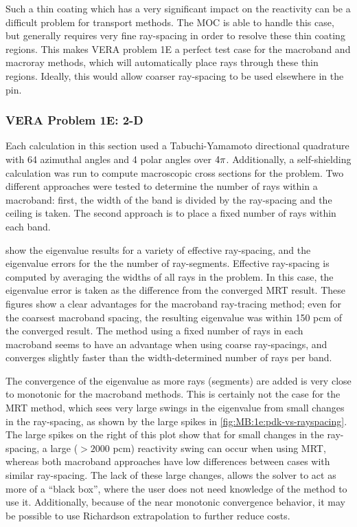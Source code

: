 {{{      Such a thin coating which has a very significant impact on the reactivity can be a difficult problem for transport methods.
      The \ac{MOC} is able to handle this case, but generally requires very fine ray-spacing in order to resolve these thin coating regions.
      This makes \ac{VERA} problem 1E a perfect test case for the macroband and macroray methods, which will automatically place rays through these thin regions.
      Ideally, this would allow coarser ray-spacing to be used elsewhere in the pin.

      \subsubsection{VERA Problem 1E: 2-D}{\label{sssec:MR:1E:2-D}
        Each calculation in this section used a Tabuchi-Yamamoto \cite{TabuchiYamamotoQuad} directional quadrature with 64 azimuthal angles and 4 polar angles over $4\pi$.
        Additionally, a self-shielding calculation was run to compute macroscopic cross sections for the problem.
        Two different approaches were tested to determine the number of rays within a macroband: first, the width of the band is divided by the ray-spacing and the ceiling is taken.
        The second approach is to place a fixed number of rays within each band.

         show the eigenvalue results for a variety of effective ray-spacing, and the eigenvalue errors for the the number of ray-segments.
        Effective ray-spacing is computed by averaging the widths of all rays in the problem.
        In this case, the eigenvalue error is taken as the difference from the converged \ac{MRT} result.
        These figures show a clear advantages for the macroband ray-tracing method;
          even for the coarsest macroband spacing, the resulting eigenvalue was within 150 pcm of the converged result.
        The method using a fixed number of rays in each macroband seems to have an advantage when using coarse ray-spacings, and converges slightly faster than the width-determined number of rays per band.

        The convergence of the eigenvalue as more rays (segments) are added is very close to monotonic for the macroband methods.
        This is certainly not the case for the \ac{MRT} method, which sees very large swings in the eigenvalue from small changes in the ray-spacing, as shown by the large spikes in \cref{fig:MB:1e:pdk-vs-rayspacing}.
        The large spikes on the right of this plot show that for small changes in the ray-spacing, a large ($>2000$ pcm) reactivity swing can occur when using \ac{MRT}, whereas both macroband approaches have low differences between cases with similar ray-spacing.
        The lack of these large changes, allows the solver to act as more of a ``black box'', where the user does not need knowledge of the method to use it.
        Additionally, because of the near monotonic convergence behavior, it may be possible to use Richardson extrapolation to further reduce costs.

}}}}
